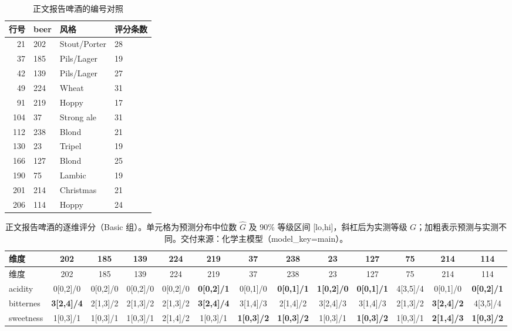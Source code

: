 \begin{landscape}
\scriptsize
\begin{table}[h]
\centering
\caption{正文报告啤酒的编号对照}\label{tab:q1_report_beers_map_basic}
\begin{tabular}{rlll}
\toprule
行号 & beer & 风格 & 评分条数 \\
\midrule
21 & 202 & Stout/Porter & 28 \\
37 & 185 & Pils/Lager & 19 \\
42 & 139 & Pils/Lager & 27 \\
49 & 224 & Wheat & 31 \\
91 & 219 & Hoppy & 17 \\
104 & 37 & Strong ale & 31 \\
112 & 238 & Blond & 21 \\
130 & 23 & Tripel & 19 \\
166 & 127 & Blond & 25 \\
190 & 75 & Lambic & 19 \\
201 & 214 & Christmas & 21 \\
206 & 114 & Hoppy & 24 \\
\bottomrule
\end{tabular}
\end{table}
\begin{longtable}{lcccccccccccc}
\caption{正文报告啤酒的逐维评分（Basic 组）。单元格为预测分布中位数 $\hat G$ 及 90\% 等级区间 [lo,hi]，斜杠后为实测等级 $G$；加粗表示预测与实测不同。交付来源：化学主模型（model\_key=main）。}\label{tab:q1_report_beers_basic}\\
\toprule
维度 & 202 & 185 & 139 & 224 & 219 & 37 & 238 & 23 & 127 & 75 & 214 & 114 \\
\midrule
\endfirsthead
\toprule
维度 & 202 & 185 & 139 & 224 & 219 & 37 & 238 & 23 & 127 & 75 & 214 & 114 \\
\midrule
\endhead
\bottomrule
\endfoot
acidity & 0[0,2]/0 & 0[0,2]/0 & 0[0,2]/0 & 0[0,2]/0 & \textbf{0[0,2]/1} & 0[0,1]/0 & \textbf{0[0,1]/1} & \textbf{1[0,2]/0} & \textbf{0[0,1]/1} & 4[3,5]/4 & 0[0,1]/0 & \textbf{0[0,2]/1} \\
bitternes & \textbf{3[2,4]/4} & 2[1,3]/2 & 2[1,3]/2 & 2[1,3]/2 & \textbf{3[2,4]/4} & 3[1,4]/3 & 2[1,4]/2 & 3[2,4]/3 & 3[1,4]/3 & 2[1,3]/2 & \textbf{3[2,4]/2} & 4[3,5]/4 \\
sweetness & 1[0,3]/1 & 1[0,3]/1 & 1[0,3]/1 & 2[1,4]/2 & 1[0,3]/1 & \textbf{1[0,3]/2} & \textbf{1[0,3]/2} & 1[0,3]/1 & \textbf{1[0,3]/2} & 1[0,3]/1 & \textbf{2[1,4]/3} & \textbf{1[0,3]/2} \\

\end{longtable}
\end{landscape}
